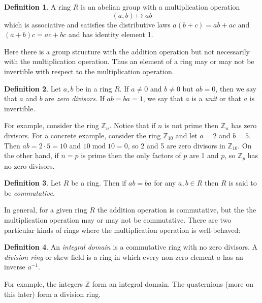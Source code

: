 \documentclass{article}
\theoremstyle{definition}
\newtheorem{definition}{Definition}[section]
\begin{document}
\noindent
\begin{definition}
A ring $R$ is an abelian group with a multiplication operation  
\begin{equation*} (a, b) \mapsto ab \end{equation*} which is 
associative and satisfies the distributive laws $a(b+c) = ab+ac$ 
and $(a+b)c = ac+bc$ and has identity element 1.
\end{definition}

\noindent
Here there is a group structure with the addition operation but
not necessarily with the multiplication operation. Thus an
element of a ring may or may not be invertible with respect to
the multiplication operation.

\begin{definition}
Let $a,b$ be in a ring $R$. If $a \neq 0$ and $b \neq 0$ but $ab
= 0$, then we say that $a$ and $b$ are \emph{zero divisors}. If
$ab = ba = 1$, we say that $a$ is a \emph{unit} or that $a$ is
invertible.
\end{definition}

\noindent
For example, consider the ring $\mathbb{Z}_n$. Notice that if $n$
is not prime then $\mathbb{Z}_n$ has zero divisors. For a
concrete example, consider the ring $\mathbb{Z}_{10}$ and let $a
= 2$ and $b = 5$. Then $ab = 2 \cdot 5 = 10$ and $10 \operatorname{mod} 
10 = 0$, so 2 and 5 are zero divisors in $\mathbb{Z}_{10}$. On the
other hand, if $n = p$ is prime then the only factors of $p$ are
1 and $p$, so $\mathbb{Z}_p$ has no zero divisors.

\begin{definition}
Let $R$ be a ring. Then if $ab = ba$ for any $a,b \in R$ then $R$
is said to be \emph{commutative}. 
\end{definition}

\noindent
In general, for a given ring $R$ the addition operation is
commutative, but the the multiplication operation may or may not
be commutative.  There are two particular kinds of rings where
the multiplication operation is well-behaved:

\begin{definition}
An \emph{integral domain} is a commutative ring with no zero
divisors. A \emph{division ring} or skew field is a ring in which
every non-zero element $a$ has an inverse $a^{-1}$.
\end{definition}

\noindent
For example, the integers $\mathbb{Z}$ form an integral
domain. The quaternions (more on this later) form a division
ring. 
\end{document}
